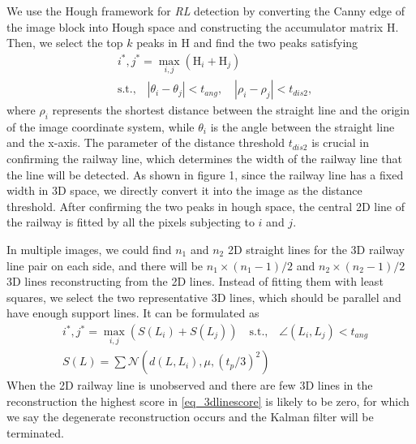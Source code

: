 We use the Hough framework for \textit{RL} detection by converting the Canny edge of the image block into Hough space and constructing the accumulator matrix $\mathrm H$.
Then,
we select the top $k$ peaks in $\mathrm H$ and find the two peaks satisfying 
\begin{equation}
    \begin{aligned}
        &i^*,j^*=\max_{i,j} \left(\mathrm{H}_i + \mathrm{H}_j \right) \\
        &\text{s.t.,} \quad |\theta_i - \theta_j| < t_{ang},
        \quad |\rho_i - \rho_j| < t_{dis2},
    \end{aligned}
\end{equation}
where $\rho_i$ represents the shortest distance between the straight line and the origin of the image coordinate system, while $\theta_i$ is the angle between the straight line and the x-axis.  
The parameter of the distance threshold $t_{dis2}$ is crucial in confirming the railway line,
which determines the width of the railway line that the line will be detected.
As shown in figure 1,
since the railway line has a fixed width in 3D space,
we directly convert it into the image as the distance threshold.
After confirming the two peaks in hough space,
the central 2D line of the railway is fitted by all the pixels subjecting to $i$ and $j$.

In multiple images,
we could find $n_1$ and $n_2$ 2D straight lines for the 3D railway line pair on each side,
and there will be \( n_1 \times (n_1-1) / 2 \) and \( n_2 \times (n_2-1) / 2 \) 3D lines reconstructing from the 2D lines.
Instead of fitting them with least squares,
we select the two representative 3D lines,
which should be parallel and have enough support lines.
It can be formulated as
\begin{equation}
    \begin{aligned}
        &i^*,j^*=\max_{i,j} \left(S\left(L_i\right) + S\left(L_j\right) \right) \quad \text{s.t.,} \quad \angle \left(L_i,L_j\right)<t_{ang} \\
        &S\left(L\right) = \sum \mathcal{N}\left(d(L,L_i), \mu, \left(t_p/3\right)^2\right)
    \end{aligned}
    \label{eq_3dlinescore}
\end{equation}
When the 2D railway line is unobserved and there are few 3D lines in the reconstruction
the highest score in \cref{eq_3dlinescore} is likely to be zero,
for which we say the degenerate reconstruction occurs and the Kalman filter will be terminated.


    








